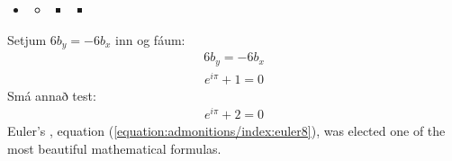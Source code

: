 \documentclass[a4paper,10pt,icelandic]{sphinxmanual}
\begin{document}
\begin{sphinxShadowBox}
\begin{itemize}
\item {} 
\sphinxAtStartPar
{}\label{\detokenize{admonitions/index:id1}}{\hyperref[\detokenize{admonitions/index:header-two}]{}}
\begin{itemize}
\item {} 
\sphinxAtStartPar
{}\label{\detokenize{admonitions/index:id2}}{\hyperref[\detokenize{admonitions/index:header-three}]{}}
\begin{itemize}
\item {} 
\sphinxAtStartPar
{}\label{\detokenize{admonitions/index:id3}}{\hyperref[\detokenize{admonitions/index:header-four}]{}}
\begin{itemize}
\item {} 
\sphinxAtStartPar
{}\label{\detokenize{admonitions/index:id4}}{\hyperref[\detokenize{admonitions/index:header-five}]{}}

\end{itemize}

\end{itemize}

\end{itemize}

\end{itemize}
\end{sphinxShadowBox}

\sphinxAtStartPar
Setjum \(6b_y=-6b_x\) inn og fáum:
\begin{equation*}
\begin{split}6b_y = -6b_x\end{split}
\end{equation*}\begin{equation}\label{equation:admonitions/index:euler7}
\begin{split}e^{i\pi} + 1 = 0\end{split}
\end{equation}
\ignorespaces 
\sphinxAtStartPar
Smá annað test:
\begin{equation}\label{equation:admonitions/index:euler8}
\begin{split}e^{i\pi} + 2 = 0\end{split}
\end{equation}
\sphinxAtStartPar
Euler’s , equation (\ref{equation:admonitions/index:euler8}), was elected one of the most
beautiful mathematical formulas.
\end{document}
